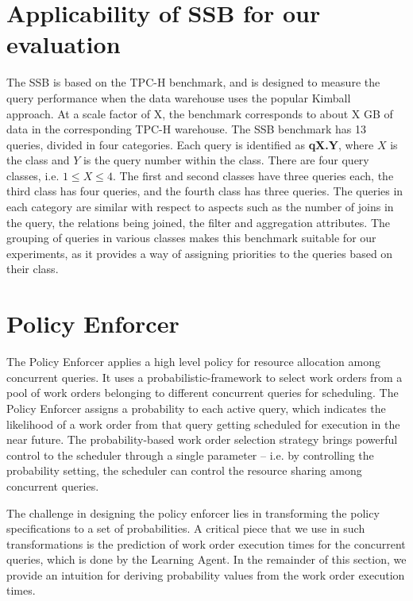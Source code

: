 \section{Applicability of SSB for our evaluation}\label{apx:ssb}
The SSB is based on the TPC-H benchmark, and is designed to measure the query performance when %
the data warehouse uses the popular Kimball~\cite{Kimball} approach. 
At a scale factor of X, the benchmark corresponds to about X GB of data in the 
corresponding TPC-H warehouse.
The SSB benchmark has 13 queries, divided in four categories. 
Each query is identified as \textbf{qX.Y}, where $X$ is the class and $Y$ is the query 
number within the class.
There are four query classes, i.e. $1\leq X\leq4$. 
The first and second classes have three queries each, the third class has four queries, and 
the fourth class has three queries.
The queries in each category are similar with respect to aspects such as the 
number of joins in the query, the relations being joined, the filter and aggregation 
attributes. 
The grouping of queries in various classes makes this benchmark suitable for our 
experiments, as it provides a way of assigning priorities to the queries based on their class. 

\section{Policy Enforcer}\label{apx:policy-enforcer}
The Policy Enforcer applies a high level policy for resource allocation among concurrent queries. 
It uses a probabilistic-framework to select work orders from a pool of work orders 
belonging to different concurrent queries for scheduling. 
The Policy Enforcer assigns a probability to each active query, which indicates the likelihood of a work order from that query getting scheduled for execution in the near future. 
The probability-based work order selection strategy brings powerful control to the scheduler through a single parameter -- i.e. by controlling the probability 
setting, the scheduler can control the resource sharing among concurrent queries. 

The challenge in designing the policy enforcer lies in transforming the policy specifications to a set of probabilities. 
A critical piece that we use in such transformations is the prediction of work order 
execution times for the concurrent queries, which is done by the Learning Agent. 
In the remainder of this section, we provide an intuition for deriving probability values from the work order execution times. 

